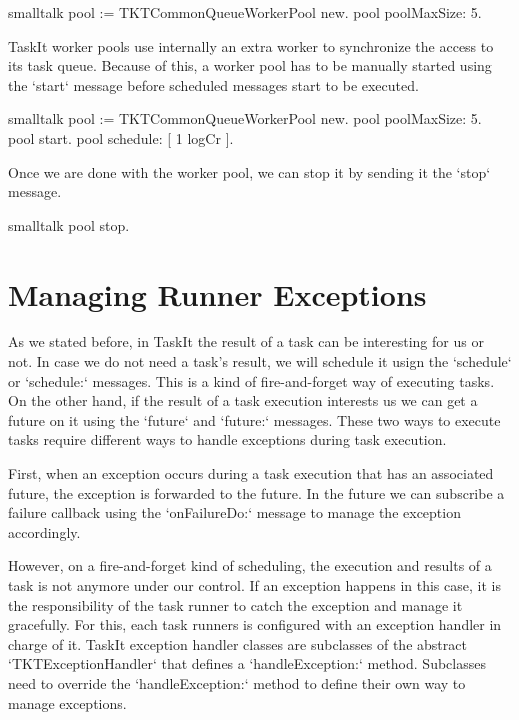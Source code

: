 \documentclass[10pt,twoside,english]{_support/latex/sbabook/sbabook}
\begin{document}
\begin{displaycode}{smalltalk}
pool := TKTCommonQueueWorkerPool new.
pool poolMaxSize: 5.
\end{displaycode}

TaskIt worker pools use internally an extra worker to synchronize the access to its task queue. Because of this, a worker pool has to be manually started using the `start` message before scheduled messages start to be executed.

\begin{displaycode}{smalltalk}
pool := TKTCommonQueueWorkerPool new.
pool poolMaxSize: 5.
pool start.
pool schedule: [ 1 logCr ].
\end{displaycode}

Once we are done with the worker pool, we can stop it by sending it the `stop` message.

\begin{displaycode}{smalltalk}
pool stop.
\end{displaycode}
\section{Managing Runner Exceptions}
As we stated before, in TaskIt the result of a task can be interesting for us or not. In case we do not need a task's result, we will schedule it usign the `schedule` or `schedule:` messages. This is a kind of fire-and-forget way of executing tasks. On the other hand, if the result of a task execution interests us we can get a future on it using the `future` and `future:` messages. These two ways to execute tasks require different ways to handle exceptions during task execution.

First, when an exception occurs during a task execution that has an associated future, the exception is forwarded to the future. In the future we can subscribe a failure callback using the `onFailureDo:` message to manage the exception accordingly.

However, on a fire-and-forget kind of scheduling, the execution and results of a task is not anymore under our control. If an exception happens in this case, it is the responsibility of the task runner to catch the exception and manage it gracefully. For this, each task runners is configured with an exception handler in charge of it. TaskIt exception handler classes are subclasses of the abstract `TKTExceptionHandler` that defines a `handleException:` method. Subclasses need to override the `handleException:` method to define their own way to manage exceptions.
\end{document}
